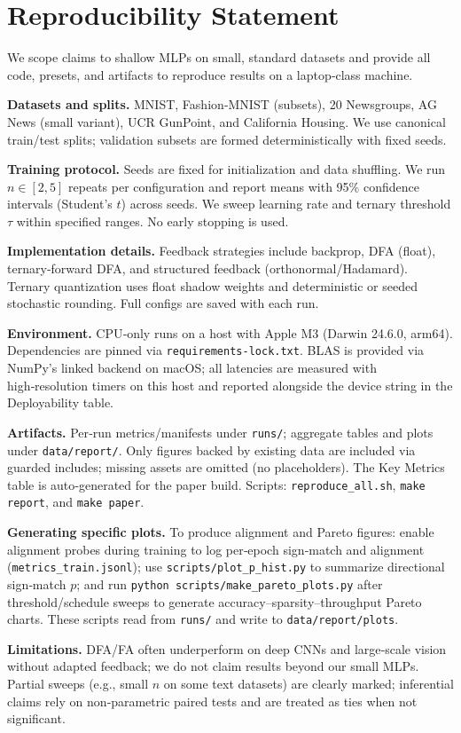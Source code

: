 \section*{Reproducibility Statement}\label{sec:repro-appendix}
We scope claims to shallow MLPs on small, standard datasets and provide all code, presets, and artifacts to reproduce results on a laptop‑class machine.

\textbf{Datasets and splits.} MNIST, Fashion‑MNIST (subsets), 20 Newsgroups, AG News (small variant), UCR GunPoint, and California Housing. We use canonical train/test splits; validation subsets are formed deterministically with fixed seeds.

\textbf{Training protocol.} Seeds are fixed for initialization and data shuffling. We run $n\!\in\![2,5]$ repeats per configuration and report means with 95\% confidence intervals (Student's $t$) across seeds. We sweep learning rate and ternary threshold $\tau$ within specified ranges. No early stopping is used.

\textbf{Implementation details.} Feedback strategies include backprop, DFA (float), ternary‑forward DFA, and structured feedback (orthonormal/Hadamard). Ternary quantization uses float shadow weights and deterministic or seeded stochastic rounding. Full configs are saved with each run.

\textbf{Environment.} CPU‑only runs on a host with Apple M3 (Darwin 24.6.0, arm64). Dependencies are pinned via \texttt{requirements‑lock.txt}. BLAS is provided via NumPy’s linked backend on macOS; all latencies are measured with high‑resolution timers on this host and reported alongside the device string in the Deployability table.

\textbf{Artifacts.} Per‑run metrics/manifests under \texttt{runs/}; aggregate tables and plots under \texttt{data/report/}. Only figures backed by existing data are included via guarded includes; missing assets are omitted (no placeholders). The Key Metrics table is auto‑generated for the paper build. Scripts: \texttt{reproduce\_all.sh}, \texttt{make report}, and \texttt{make paper}.

\textbf{Generating specific plots.} To produce alignment and Pareto figures: enable alignment probes during training to log per‑epoch sign‑match and alignment (\texttt{metrics\_train.jsonl}); use \texttt{scripts/plot\_p\_hist.py} to summarize directional sign‑match $p$; and run \texttt{python scripts/make\_pareto\_plots.py} after threshold/schedule sweeps to generate accuracy–sparsity–throughput Pareto charts. These scripts read from \texttt{runs/} and write to \texttt{data/report/plots}.

\textbf{Limitations.} DFA/FA often underperform on deep CNNs and large‑scale vision without adapted feedback; we do not claim results beyond our small MLPs. Partial sweeps (e.g., small $n$ on some text datasets) are clearly marked; inferential claims rely on non‑parametric paired tests and are treated as ties when not significant.

